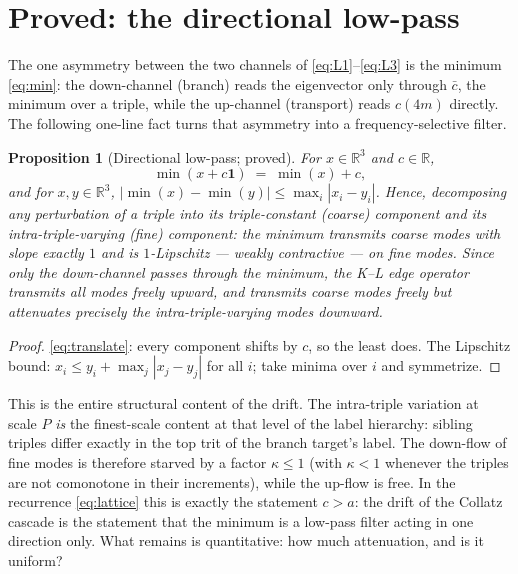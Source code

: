 \documentclass[11pt]{article}
\newtheorem{proposition}[theorem]{Proposition}
\theoremstyle{definition}
\theoremstyle{remark}
\newcommand{\R}{\mathbb{R}}
\newcommand{\kap}{\kappa}
\begin{document}
\section{Proved: the directional low-pass}
\label{sec:lowpass}

The one asymmetry between the two channels of
\eqref{eq:L1}--\eqref{eq:L3} is the minimum \eqref{eq:min}: the
down-channel (branch) reads the eigenvector only through $\bar c$, the
minimum over a triple, while the up-channel (transport) reads $c(4m)$
directly. The following one-line fact turns that asymmetry into a
frequency-selective filter.

\begin{proposition}[Directional low-pass; proved]\label{prop:lowpass}
For $x \in \R^3$ and $c \in \R$,
\begin{equation}
\min(x + c\mathbf{1}) \;=\; \min(x) + c ,
\label{eq:translate}
\end{equation}
and for $x, y \in \R^3$,
$|\min(x) - \min(y)| \leq \max_i |x_i - y_i|$. Hence, decomposing any
perturbation of a triple into its triple-constant (coarse) component and
its intra-triple-varying (fine) component: the minimum transmits coarse
modes with slope exactly $1$ and is $1$-Lipschitz --- weakly contractive
--- on fine modes. Since only the down-channel passes through the minimum,
the K--L edge operator transmits all modes freely upward, and transmits
coarse modes freely but attenuates precisely the intra-triple-varying
modes downward.
\end{proposition}

\begin{proof}
\eqref{eq:translate}: every component shifts by $c$, so the least does.
The Lipschitz bound: $x_i \leq y_i + \max_j |x_j - y_j|$ for all $i$; take
minima over $i$ and symmetrize.
\end{proof}

This is the entire structural content of the drift. The intra-triple
variation at scale $P$ \emph{is} the finest-scale content at that level of
the label hierarchy: sibling triples differ exactly in the top trit of the
branch target's label. The down-flow of fine modes is therefore starved by
a factor $\kap \leq 1$ (with $\kap < 1$ whenever the triples are not
comonotone in their increments), while the up-flow is free. In the
recurrence \eqref{eq:lattice} this is exactly the statement $c > a$: the
drift of the Collatz cascade is the statement that the minimum is a
low-pass filter acting in one direction only. What remains is
quantitative: how much attenuation, and is it uniform?
\end{document}

